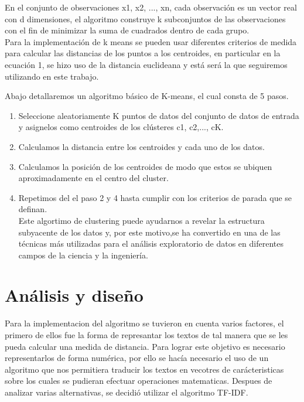 \documentclass[conference,compsoc]{IEEEtran}
\begin{document}
En el conjunto de observaciones x1, x2, ..., xn, cada observación es un vector
real con d dimensiones, el algoritmo construye k subconjuntos de las
observaciones con el fin de minimizar la suma de cuadrados dentro de cada
grupo.\\

Para la implementación de k means se pueden usar diferentes criterios de medida
para calcular las distancias de los puntos a los centroides, en particular en
la ecuación 1, se hizo uso de la distancia euclideana y está será la que
seguiremos utilizando en este trabajo.

Abajo detallaremos un algoritmo básico de K-means, el cual consta de 5 pasos.\\

\begin{enumerate}[]
    \item Seleccione aleatoriamente K puntos de datos del conjunto de datos de
          entrada y asignelos como centroides de los clústeres c1, c2,..., cK.
    \item Calculamos la distancia entre los centroides y cada uno de los datos.
    \item Calculamos la posición de los centroides de modo que estos se ubiquen
          aproximadamente en el centro del cluster.
    \item Repetimos del el paso 2 y 4 hasta cumplir con los criterios de parada
          que se definan.\\

Este algortimo de clustering puede ayudarnos a revelar la estructura subyacente
de los datos y, por este motivo,se ha convertido en una de las técnicas más
utilizadas para el análisis exploratorio de datos en diferentes campos de la
ciencia y la ingeniería.

\end{enumerate}

\section{Análisis y diseño}

Para la implementacion del algoritmo se tuvieron en cuenta varios factores,
el primero de ellos fue la forma de represantar los textos de tal manera que se
les pueda calcular una medida de distancia. Para lograr este objetivo es
necesario representarlos de forma numérica, por ello se hacía necesario el uso
de un algoritmo que nos permitiera traducir los textos en vecotres de
carácteristicas sobre los cuales se pudieran efectuar
operaciones matematicas. Despues de analizar varias alternativas, se decidió
utilizar el algoritmo TF-IDF.\\
\end{document}
